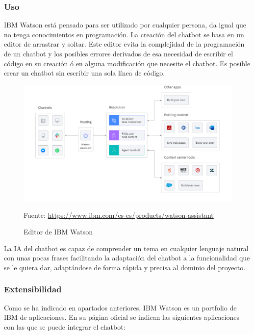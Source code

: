 \subsubsection*{Uso}

IBM Watson está pensado para ser utilizado por cualquier persona, da igual que no tenga conocimientos en programación. La creación del chatbot se basa en un editor de arrastrar y soltar. Este editor evita la complejidad de la programación de un chatbot y los posibles errores derivados de esa necesidad de escribir el código en su creación ó en alguna modificación que necesite el chatbot. Es posible crear un chatbot sin escribir una sola línea de código.

\begin{figure}[h]
    \centering
    \includegraphics[width=1.0\textwidth]{imagenes/02_EstadoDelArte/editor_IBM_Watson.png}
    \begin{center}
        Fuente: \url{https://www.ibm.com/es-es/products/watson-assistant}
    \end{center}
    \caption{Editor de IBM Watson}
\end{figure}

La IA del chatbot es capaz de comprender un tema en cualquier lenguaje natural con unas pocas frases facilitando la adaptación del chatbot a la funcionalidad que se le quiera dar, adaptándose de forma rápida y precisa al dominio del proyecto.

\subsubsection*{Extensibilidad}

Como se ha indicado en apartados anteriores, IBM Watson es un portfolio de IBM de aplicaciones. En su página oficial \cite{RefWorks:RefID:19-2021productos} se indican las siguientes aplicaciones con las que se puede integrar el chatbot:


